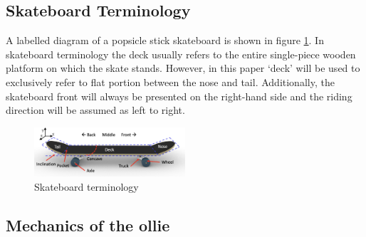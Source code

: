 \documentclass[default,iicol]{sn-jnl}
\begin{document}
\subsection{Skateboard Terminology}
A labelled diagram of a popsicle stick skateboard is shown in figure \ref{fig:skateboard terminology}. 
In skateboard terminology the deck usually refers to the entire single-piece wooden platform on which the skate stands.
However, in this paper `deck' will be used to exclusively refer to flat portion between the nose and tail.
Additionally, the skateboard front will always be presented on the right-hand side and the riding direction will be assumed as left to right.

\begin{figure}[t]
    \includegraphics[width=0.5\textwidth]{figure/terminology.png}
    \caption[Skateboard terminology]{Skateboard terminology}
    \label{fig:skateboard terminology}
\end{figure}

\subsection{Mechanics of the ollie} \label{ss_mechanics}


\end{document}
